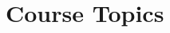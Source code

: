 \documentclass[11pt]{article}
\begin{document}
%
%
%    
%    
%    
%    
%    
%

\section*{Course Topics}
\end{document}
